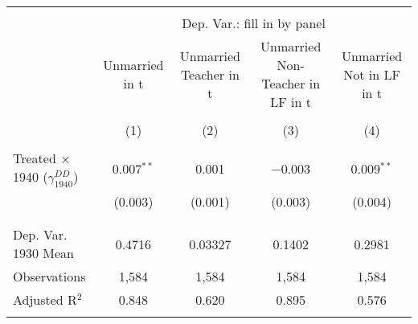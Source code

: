 
\begin{tabular}{@{\extracolsep{5pt}}lcccc} 
\\[-1.8ex]\hline 
\hline \\[-1.8ex] 
 & \multicolumn{4}{c}{Dep. Var.: fill in by panel} \\ 
\cline{2-5} 
 & Unmarried in t & Unmarried Teacher in t & Unmarried Non-Teacher in LF in t & Unmarried Not in LF in t \\ 
\\[-1.8ex] & (1) & (2) & (3) & (4)\\ 
\hline \\[-1.8ex] 
 Treated $\times$ 1940 ($\gamma_{1940}^{DD}$) & 0.007$^{**}$ & 0.001 & $-$0.003 & 0.009$^{**}$ \\ 
  & (0.003) & (0.001) & (0.003) & (0.004) \\ 
  & & & & \\ 
\hline \\[-1.8ex] 
Dep. Var. 1930 Mean & 0.4716 & 0.03327 & 0.1402 & 0.2981 \\ 
Observations & 1,584 & 1,584 & 1,584 & 1,584 \\ 
Adjusted R$^{2}$ & 0.848 & 0.620 & 0.895 & 0.576 \\ 
\hline 
\hline \\[-1.8ex] 
\end{tabular} 
